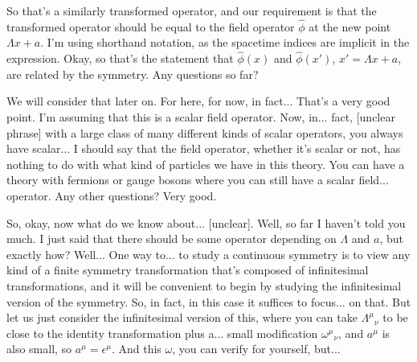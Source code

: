 \noindent
So that's a similarly transformed operator, and our requirement is that the transformed operator should be equal to the field operator $\hat\phi$ at the new point $\Lambda x+a$. I'm using shorthand notation, as the spacetime indices are implicit in the expression.
Okay, so that's the statement that $\hat\phi(x)$ and $\hat\phi(x')$, $x'=\Lambda x+a$, are related by the symmetry. Any questions so far?

\medskip
\noindent
We will consider that later on. For here, for now, in fact... That's a very good point. I'm assuming that this is a scalar field operator. Now, in...
fact, [unclear phrase] with a large class of many different kinds of scalar operators, you always have scalar... I should say that the field operator, whether it's scalar or not, has nothing to do with what kind of particles we have in this theory. You can have a theory with fermions or gauge bosons where you can still have a scalar field...
operator. Any other questions? Very good.

\medskip
\noindent
So, okay, now what do we know about... [unclear]. Well, so far I haven't told you much. I just said that there should be some operator depending on $\Lambda$ and $a$, but exactly how? Well... One way to...
to study a continuous symmetry is to view any kind of a finite symmetry transformation that's composed of infinitesimal transformations, and it will be convenient to begin by studying the infinitesimal version of the symmetry. So, in fact, in this case it suffices to focus...
on that. But let us just consider the infinitesimal version of this, where you can take $\Lambda^\mu{}_\nu$ to be close to the identity transformation plus a...
small modification $\omega^\mu{}_\nu$, and $a^\mu$ is also small, so $a^\mu=\epsilon^\mu$. And this $\omega$, you can verify for yourself, but...

